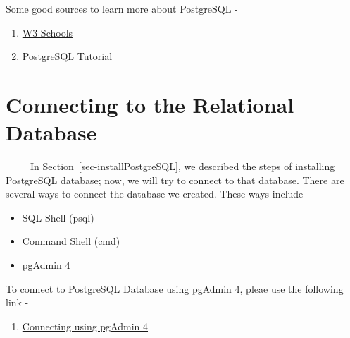 \documentclass[
  letterpaper,
  DIV=11,
  numbers=noendperiod]{scrreprt}
\providecommand{\tightlist}{%
  \setlength{\itemsep}{0pt}\setlength{\parskip}{0pt}}
\begin{document}
\begin{tcolorbox}[enhanced jigsaw, arc=.35mm, bottomrule=.15mm, bottomtitle=1mm, breakable, colback=white, colbacktitle=quarto-callout-tip-color!10!white, colframe=quarto-callout-tip-color-frame, coltitle=black, left=2mm, leftrule=.75mm, opacityback=0, opacitybacktitle=0.6, rightrule=.15mm, title=\textcolor{quarto-callout-tip-color}{\faLightbulb}\hspace{0.5em}{Tip}, titlerule=0mm, toprule=.15mm, toptitle=1mm]

Some good sources to learn more about PostgreSQL -

\begin{enumerate}
\def\labelenumi{\arabic{enumi}.}
\item
  \href{https://www.w3schools.com/postgresql/index.php}{W3 Schools}
\item
  \href{https://www.postgresqltutorial.com/postgresql-getting-started/install-postgresql/}{PostgreSQL
  Tutorial}
\end{enumerate}

\end{tcolorbox}

\section{Connecting to the Relational
Database}\label{connecting-to-the-relational-database}

~~~~~In Section~\ref{sec-installPostgreSQL}, we described the steps of
installing PostgreSQL database; now, we will try to connect to that
database. There are several ways to connect the database we created.
These ways include -

\begin{itemize}
\tightlist
\item
  SQL Shell (psql)
\item
  Command Shell (cmd)
\item
  pgAdmin 4
\end{itemize}

\begin{tcolorbox}[enhanced jigsaw, arc=.35mm, bottomrule=.15mm, bottomtitle=1mm, breakable, colback=white, colbacktitle=quarto-callout-tip-color!10!white, colframe=quarto-callout-tip-color-frame, coltitle=black, left=2mm, leftrule=.75mm, opacityback=0, opacitybacktitle=0.6, rightrule=.15mm, title=\textcolor{quarto-callout-tip-color}{\faLightbulb}\hspace{0.5em}{Tip}, titlerule=0mm, toprule=.15mm, toptitle=1mm]

To connect to PostgreSQL Database using pgAdmin 4, pleae use the
following link -

\begin{enumerate}
\def\labelenumi{\arabic{enumi}.}
\tightlist
\item
  \href{https://www.w3schools.com/postgresql/postgresql_pgadmin4.php}{Connecting
  using pgAdmin 4}
\end{enumerate}

\end{tcolorbox}
\end{document}
